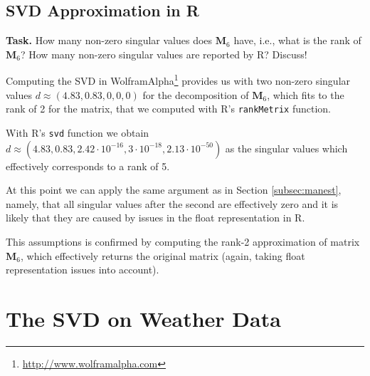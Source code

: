\documentclass{support/acm_proc_article-sp}
\begin{document}

    \subsection{SVD Approximation in R}

    \textbf{Task.} How many non-zero singular values does $\mathbf{M}_{6}$ have, i.e.\@, what is the rank
    of $\mathbf{M}_{6}$?
    How many non-zero singular values are reported by R?
    Discuss!

    Computing the SVD in WolframAlpha\footnote{\href{http://www.wolframalpha.com/input/?i=svd+\%7B\%7B1,1,1,1,1\%7D,\%7B1,1,1,1,1\%7D,\%7B1,1,0,1,1\%7D,\%7B1,1,1,1,1\%7D,\%7B1,1,1,1,1\%7D\%7D}{http://www.wolframalpha.com}}
    provides us with two non-zero singular values $d \approx (4.83, 0.83, 0, 0, 0)$ for the decomposition of $\mathbf{M}_{6}$, which fits to the rank
    of 2 for the matrix, that we computed with R's \lstinline{rankMetrix} function.

    With R's \lstinline{svd} function we obtain $d \approx (4.83, 0.83, 2.42\cdot10^{-16}, 3\cdot10^{-18}, 2.13\cdot10^{-50})$
    as the singular values which effectively corresponds to a rank of 5.

    At this point we can apply the same argument as in Section \ref{subsec:manest}, namely, that all singular values after
    the second are effectively zero and it is likely that they are caused by issues in the float representation in R\@.

    This assumptions is confirmed by computing the rank-2 approximation of matrix $\mathbf{M}_{6}$, which effectively
    returns the original matrix (again, taking float representation issues into account).


    \section{The SVD on Weather Data}

\end{document}
